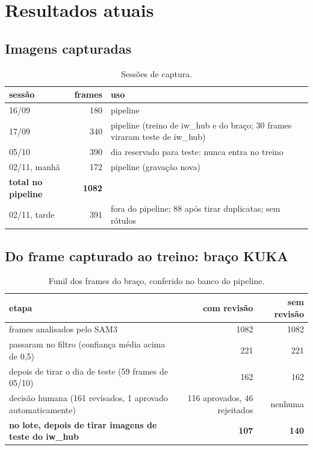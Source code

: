 \documentclass[11pt,a4paper]{article}
\begin{document}
\section{Resultados atuais}

\subsection{Imagens capturadas}

\begin{table}[H]
\centering\small
\caption{Sessões de captura.}
\begin{tabular}{lrp{9.5cm}}
\toprule
sessão & frames & uso \\
\midrule
16/09 & 180 & pipeline \\
17/09 & 340 & pipeline (treino de iw\_hub e do braço; 30 frames viraram teste de iw\_hub) \\
05/10 & 390 & dia reservado para teste: nunca entra no treino \\
02/11, manhã & 172 & pipeline (gravação nova) \\
\textbf{total no pipeline} & \textbf{1082} & \\
02/11, tarde & 391 & fora do pipeline; 88 após tirar duplicatas; sem rótulos \\
\bottomrule
\end{tabular}
\end{table}

\subsection{Do frame capturado ao treino: braço KUKA}

\begin{table}[H]
\centering\small
\caption{Funil dos frames do braço, conferido no banco do pipeline.}
\label{tab:funil}
\begin{tabular}{p{7cm}rr}
\toprule
etapa & com revisão & sem revisão \\
\midrule
frames analisados pelo SAM3 & 1082 & 1082 \\
passaram no filtro (confiança média acima de 0,5) & 221 & 221 \\
depois de tirar o dia de teste (59 frames de 05/10) & 162 & 162 \\
decisão humana (161 revisados, 1 aprovado automaticamente) & 116 aprovados, 46 rejeitados & nenhuma \\
\textbf{no lote, depois de tirar imagens de teste do iw\_hub} & \textbf{107} & \textbf{140} \\
\bottomrule
\end{tabular}
\end{table}
\end{document}
